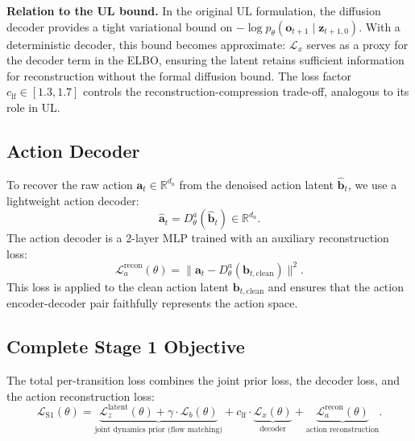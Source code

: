 \documentclass{article}
\newcommand{\vo}{\bm{o}}
\newcommand{\vz}{\bm{z}}
\newcommand{\va}{\bm{a}}
\newcommand{\vb}{\bm{b}}
\newcommand{\R}{\mathbb{R}}
\newcommand{\loss}{\mathcal{L}}
\begin{document}
\textbf{Relation to the UL bound.}
In the original UL formulation, the diffusion decoder provides a tight variational bound on $-\log p_\theta(\vo_{t+1} \mid \vz_{t+1,0})$.
With a deterministic decoder, this bound becomes approximate: $\loss_x$ serves as a proxy for the decoder term in the ELBO, ensuring the latent retains sufficient information for reconstruction without the formal diffusion bound.
The loss factor $c_{\text{lf}} \in [1.3, 1.7]$ controls the reconstruction-compression trade-off, analogous to its role in UL.

\subsection{Action Decoder}
\label{sec:action_decoder}

To recover the raw action $\va_t \in \R^{d_a}$ from the denoised action latent $\hat{\vb}_t$, we use a lightweight action decoder:
\begin{equation}
  \hat{\va}_t = D_\theta^a(\hat{\vb}_t) \in \R^{d_a}.
  \label{eq:action_decode}
\end{equation}
The action decoder is a 2-layer MLP trained with an auxiliary reconstruction loss:
\begin{equation}
  \loss_a^{\text{recon}}(\theta) = \|\va_t - D_\theta^a(\vb_{t,\text{clean}})\|^2.
  \label{eq:action_recon_loss}
\end{equation}
This loss is applied to the clean action latent $\vb_{t,\text{clean}}$ and ensures that the action encoder-decoder pair faithfully represents the action space.

\subsection{Complete Stage 1 Objective}
\label{sec:stage1_objective}

The total per-transition loss combines the joint prior loss, the decoder loss, and the action reconstruction loss:
\begin{equation}
  \loss_{\text{S1}}(\theta) = \underbrace{\loss_z^{\text{latent}}(\theta) + \gamma \cdot \loss_b(\theta)}_{\text{joint dynamics prior (flow matching)}} + c_{\text{lf}} \cdot \underbrace{\loss_x(\theta)}_{\text{decoder}} + \underbrace{\loss_a^{\text{recon}}(\theta)}_{\text{action reconstruction}}.
  \label{eq:total_loss}
\end{equation}
\end{document}
